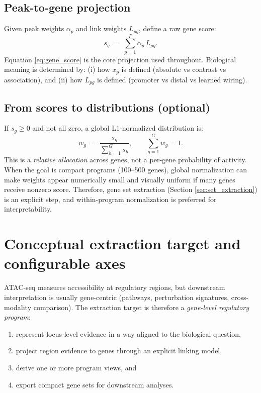 \documentclass[11pt]{article}
\begin{document}
\subsection{Peak-to-gene projection}
\label{sec:projection}
Given peak weights $\alpha_p$ and link weights $L_{pg}$, define a raw gene score:
\begin{equation}
s_g \;=\; \sum_{p=1}^P \alpha_p \, L_{pg}.
\label{eq:gene_score}
\end{equation}
Equation \eqref{eq:gene_score} is the core projection used throughout. Biological meaning is determined by:
(i) how $x_p$ is defined (absolute vs contrast vs association), and
(ii) how $L_{pg}$ is defined (promoter vs distal vs learned wiring).

\subsection{From scores to distributions (optional)}
If $s_g \ge 0$ and not all zero, a global L1-normalized distribution is:
\begin{equation}
w_g \;=\; \frac{s_g}{\sum_{h=1}^G s_h},
\qquad \sum_{g=1}^G w_g = 1.
\label{eq:l1_all_genes}
\end{equation}
This is a \emph{relative allocation} across genes, not a per-gene probability of activity. When the goal is compact programs (100--500 genes), global normalization can make weights appear numerically small and visually uniform if many genes receive nonzero score. Therefore, gene set extraction (Section \ref{sec:set_extraction}) is an explicit step, and within-program normalization is preferred for interpretability.

\section{Conceptual extraction target and configurable axes}
\label{sec:conceptual_axes}
ATAC-seq measures accessibility at regulatory regions, but downstream interpretation is usually gene-centric (pathways, perturbation signatures, cross-modality comparison).
The extraction target is therefore a \emph{gene-level regulatory program}:
\begin{enumerate}[leftmargin=2em]
\item represent locus-level evidence in a way aligned to the biological question,
\item project region evidence to genes through an explicit linking model,
\item derive one or more program views, and
\item export compact gene sets for downstream analyses.
\end{enumerate}
\end{document}
